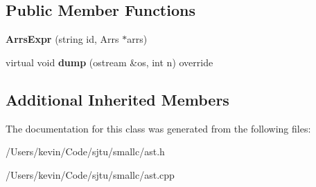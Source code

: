 \subsection*{Public Member Functions}
\begin{DoxyCompactItemize}
\item 
\mbox{\label{class_arrs_expr_aad2e2cc9461b024ca57422e3e2ad4009}} 
{\bfseries Arrs\+Expr} (string id, Arrs $\ast$arrs)
\item 
\mbox{\label{class_arrs_expr_af1d2325d4a8678c63d94610a20013548}} 
virtual void {\bfseries dump} (ostream \&os, int n) override
\end{DoxyCompactItemize}
\subsection*{Additional Inherited Members}


The documentation for this class was generated from the following files\+:\begin{DoxyCompactItemize}
\item 
/\+Users/kevin/\+Code/sjtu/smallc/ast.\+h\item 
/\+Users/kevin/\+Code/sjtu/smallc/ast.\+cpp\end{DoxyCompactItemize}
